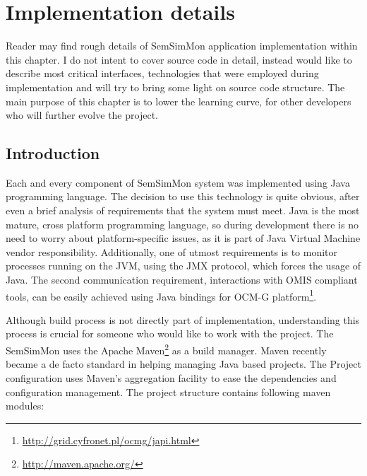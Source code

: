 %
\chapter{Implementation details}
\label{cha:implementation}

\parbox{0.8\textwidth}{

{\small
Reader may find rough details of SemSimMon application implementation within this chapter. I do not intent to cover source code in detail, instead would like to describe most critical interfaces, technologies that were employed during implementation and will try to bring some light on source code structure. The main purpose of this chapter is to lower the learning curve, for other developers who will further evolve the project.
}
}


\section{Introduction}

Each and every component of SemSimMon system was implemented using Java programming language. The decision to use this technology is quite obvious, after even a brief analysis of requirements that the system must meet. Java is the most mature, cross platform programming language, so during development there is no need to worry about platform-specific issues, as it is part of Java Virtual Machine vendor responsibility. Additionally, one of utmost requirements is to monitor processes running on the JVM, using the JMX protocol, which forces the usage of Java. The second communication requirement, interactions with OMIS compliant tools, can be easily achieved using Java bindings for OCM-G platform\footnote{\url{http://grid.cyfronet.pl/ocmg/japi.html}}.

Although build process is not directly part of implementation, understanding this process is crucial for someone who would like to work with the project. The SemSimMon uses the Apache Maven\footnote{\url{http://maven.apache.org/}} as a build manager. Maven recently became a de facto standard in helping managing Java based projects. The Project configuration uses Maven's aggregation facility to ease the dependencies and configuration management. The project structure contains following maven modules: 

